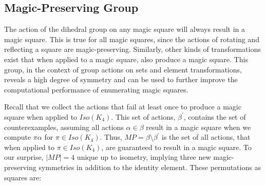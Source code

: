 \documentclass{rhumj_new}
\begin{document}
\subsection{Magic-Preserving Group}

The action of the dihedral group on any magic square will always result in a magic square.
This is true for all magic squares, since the actions of rotating and reflecting a square are
magic-preserving. Similarly, other kinds of transformations exist that when applied to a magic
square, also produce a magic square. This group, in the context of group actions on sets and
element transformations, reveals a high degree of symmetry and can be used to further improve the
computational performance of enumerating magic squares.

Recall that we collect the actions
that fail at least once to produce a magic square when applied to $Iso(K_4)$. This set of actions,
${\beta}^\prime$, contains the set of counterexamples, assuming all actions $\alpha\in\beta$ result
in a magic square when we compute $\pi\alpha$ for $\pi\in Iso(K_4)$. Thus,
$MP=\beta\setminus{\beta}^\prime$ is the set of all actions, that when applied to $\pi\in
  Iso(K_4)$, are guaranteed to result in a magic square. To our surprise, $\left|MP\right|=4$
unique
up to isometry, implying three new magic-preserving symmetries in addition to the identity element.
These permutations as squares are:
\end{document}
